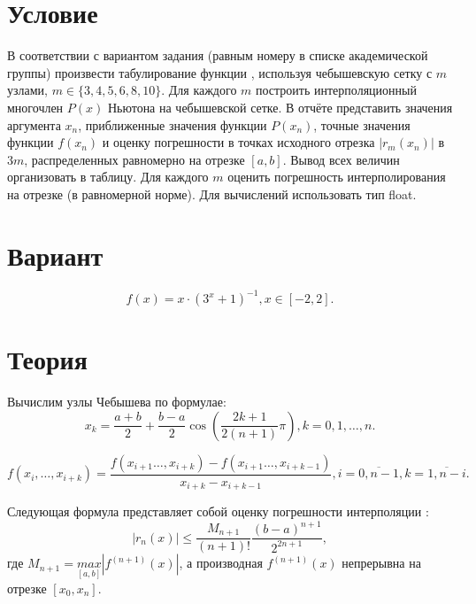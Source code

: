 \documentclass{article}
\begin{document}
\section{Условие}
В соответствии с вариантом задания (равным номеру в списке академической группы) произвести табулирование функции , используя чебышевскую сетку с $m$ узлами, $m \in \{3, 4, 5, 6, 8, 10\}$. Для каждого $m$ построить интерполяционный многочлен $P(x)$ Ньютона  на чебышевской сетке.
В отчёте представить значения аргумента $x_n$, приближенные значения функции $P(x_n)$, точные значения функции $f(x_n)$ и оценку погрешности  в  точках исходного отрезка $|r_m(x_n)|$ в $3m$, распределенных равномерно на отрезке $[a,b]$. Вывод всех величин организовать в таблицу. Для каждого $m$ оценить погрешность интерполирования на отрезке (в равномерной норме). Для вычислений использовать тип float.

\section{Вариант}
\begin{equation}
    \label{eq:variant}
    f(x) = x \cdot (3^x + 1)^{-1}, x \in [-2, 2].
\end{equation}

\section{Теория}
Вычислим узлы Чебышева по формулае:
\begin{equation}
    \label{eq:node}
    x_k = \dfrac{a+b}{2} + \dfrac{b-a}{2} \cos{\left(\dfrac{2k+1}{2(n+1)} \pi\right)}, k = 0, 1, \ldots, n. 
\end{equation}

\begin{equation}
    \label{eq:raznost_vyvod}
    f(x_i, \ldots, x_{i+k}) = \dfrac{f(x_{i+1}\ldots, x_{i+k}) - f(x_{i+1}\ldots, x_{i+k-1})}{x_{i+k} - x_{i+k-1}}, i = \overline{0, n-1}, k = \overline{1, n-i}.
\end{equation}


Следующая формула представляет собой оценку погрешности интерполяции :
\begin{equation}
    \label{eq:pogr}
    |r_n(x)| \leqslant \dfrac{M_{n+1}}{(n+1)!} \dfrac{(b-a)^{n+1}}{2^{2n + 1}},
\end{equation}
где $M_{n+1} = \underset{[a,b]}{max}|f^{(n+1)}(x)|$, а производная $f^{(n+1)}(x)$ непрерывна на отрезке $[x_0, x_n]$.
\end{document}
